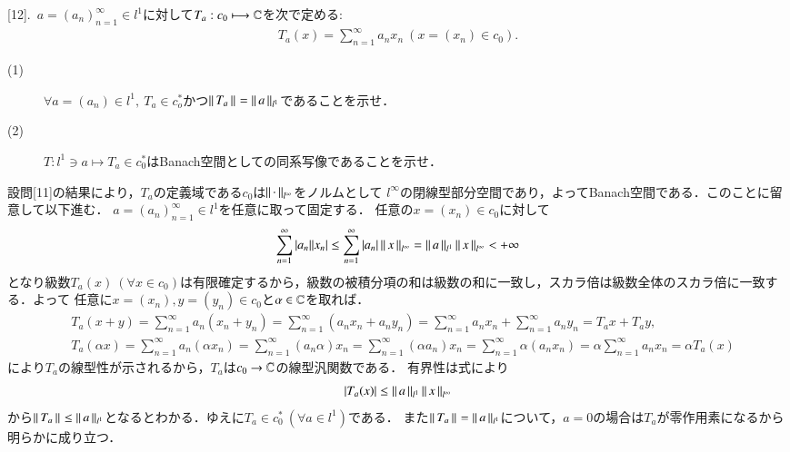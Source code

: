 [12].\ $a = (a_n)_{n=1}^{\infty} \in l^1$に対して$T_a:c_0 \longmapsto \mathbb{C}$を次で定める:
	\begin{align}
		T_a(x) = \sum_{n=1}^{\infty}a_n x_n\ (x=(x_n) \in c_0).
	\end{align}
	\begin{description}
		\item[(1)] $\forall a = (a_n) \in l^1,\ T_a \in c_o^*$かつ$\left\|\, T_a\, \right\|_{} = \left\|\, a\, \right\|_{l^1}$であることを示せ．
		\item[(2)] $T:l^1 \ni a \longmapsto T_a \in c_0^*$はBanach空間としての同系写像であることを示せ．
	\end{description}

\begin{prf}
\begin{description}\mbox{}
	\item[(1)] 
		設問[11]の結果により，$T_a$の定義域である$c_0$は$\left\|\, \cdot\, \right\|_{l^{\infty}}$をノルムとして
		$l^{\infty}$の閉線型部分空間であり，よってBanach空間である．このことに留意して以下進む．
		$a = (a_n)_{n=1}^{\infty} \in l^1$を任意に取って固定する．
		任意の$x=(x_n) \in c_0$に対して
		\begin{align}
			\sum_{n=1}^{\infty} |a_n| |x_n| \leq \sum_{n=1}^{\infty} |a_n| \left\|\, x\, \right\|_{l^{\infty}} = \left\|\, a\, \right\|_{l^1} \left\|\, x\, \right\|_{l^{\infty}} < +\infty
		\end{align}
		となり級数$T_a (x)\ (\forall x \in c_0)$は有限確定するから，級数の被積分項の和は級数の和に一致し，スカラ倍は級数全体のスカラ倍に一致する．よって
		任意に$x=(x_n), y=(y_n) \in c_0$と$\alpha \in \mathbb{C}$を取れば．
		\begin{align}
			&T_a(x + y) = \sum_{n=1}^{\infty}a_n (x_n + y_n) 
			= \sum_{n=1}^{\infty} (a_n x_n + a_n y_n) = \sum_{n=1}^{\infty}a_n x_n + \sum_{n=1}^{\infty}a_n y_n = T_a x + T_a y, \\
			&T_a(\alpha x) = \sum_{n=1}^{\infty}a_n(\alpha x_n) = \sum_{n=1}^{\infty}(a_n\alpha)x_n = \sum_{n=1}^{\infty}(\alpha a_n)x_n
			= \sum_{n=1}^{\infty}\alpha (a_n x_n) = \alpha \sum_{n=1}^{\infty} a_n x_n = \alpha T_a(x)
		\end{align}
		により$T_a$の線型性が示されるから，$T_a$は$c_0 \rightarrow \mathbb{C}$の線型汎関数である．
		有界性は式により
		\begin{align}
			|T_a(x)| \leq \left\|\, a\, \right\|_{l^1} \left\|\, x\, \right\|_{l^{\infty}}
		\end{align}
		から$\left\|\, T_a\, \right\|_{} \leq \left\|\, a\, \right\|_{l^1}$となるとわかる．ゆえに$T_a \in c_0^*\ (\forall a \in l^1)$である．
		また$\left\|\, T_a\, \right\|_{} = \left\|\, a\, \right\|_{l^1}$について，$a=0$の場合は$T_a$が零作用素になるから明らかに成り立つ．

\end{description}
\end{prf}
